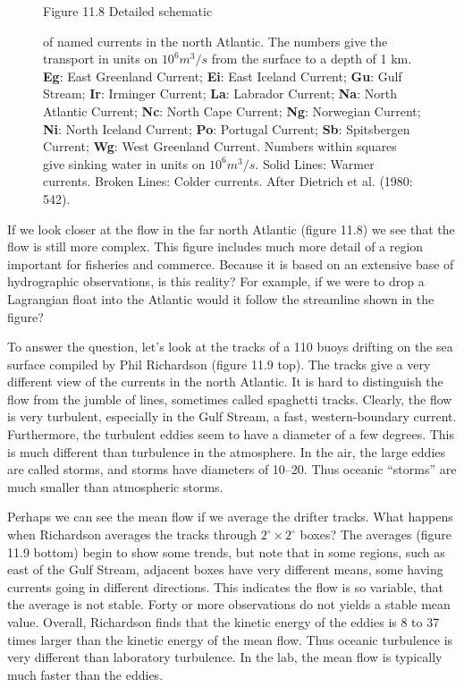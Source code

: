 \begin{figure}[t!]
\footnotesize
Figure 11.8 Detailed schematic \rule{0mm}{3ex}of named currents in the
north Atlantic.  The numbers give the transport in units on $10^6 m^3/s$ from the surface to a depth
of 1 km. \textbf{Eg}: East Greenland Current; \textbf{Ei}: East
Iceland Current; \textbf{Gu}: Gulf Stream;
\textbf{Ir}: Irminger Current; \textbf{La}: Labrador Current;
\textbf{Na}: North Atlantic Current; \textbf{Nc}: North Cape Current;
\textbf{Ng}: Norwegian Current; \textbf{Ni}: North Iceland Current;
\textbf{Po}: Portugal Current; \textbf{Sb}: Spitsbergen Current;
\textbf{Wg}: West Greenland Current. Numbers within squares give
sinking water in units on $10^6 m^3 /s$. Solid Lines: Warmer
currents. Broken Lines: Colder currents. After Dietrich et al. (1980:
542).
\label{fig:NATLcur1}
\vspace{-3ex}
\end{figure}

If we look closer at the flow in the far north Atlantic (figure 11.8)
we see that the flow is still more complex. This figure includes much
more detail of a region important for fisheries and commerce. Because
it is based on an extensive base of hydrographic observations, is this
reality? For example, if we were to drop a Lagrangian float into the
Atlantic would it follow the streamline shown in the figure?

To answer the question, let's look at the tracks of a 110 buoys
drifting on the sea surface compiled by Phil Richardson (figure 11.9
top). The tracks give a very different view of the currents in the
north Atlantic. It is hard to distinguish the flow from the jumble of
lines, sometimes called spaghetti tracks. Clearly, the flow is very
turbulent, especially in the Gulf Stream, a fast, western-boundary current. Furthermore, the
turbulent eddies seem to have a diameter of a few degrees. This is
much different than turbulence in the atmosphere. In
the air, the large eddies are called storms, and storms have diameters
of 10\degrees --20\degrees. Thus oceanic ``storms'' are much smaller
than atmospheric storms.

Perhaps we can see the mean flow if we average the drifter
tracks. What happens when Richardson averages the tracks through
$2^{\circ} \times 2^{\circ}$ boxes? The averages (figure 11.9 bottom)
begin to show some trends, but note that in some regions, such as east
of the Gulf Stream, adjacent boxes have very different means, some
having currents going in different directions. This indicates the flow
is so variable, that the average is not stable. Forty or more
observations do not yields a stable mean value. Overall, Richardson
finds that the kinetic energy of the eddies is 8 to 37 times larger
than the kinetic energy of the mean flow. Thus oceanic
turbulence is very different than laboratory
turbulence. In the lab, the mean flow is
typically much faster than the eddies.

